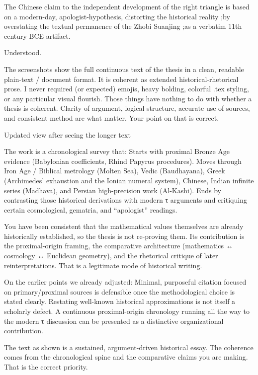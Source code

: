 The Chinese claim to the independent development of the right triangle is based on a modern-day, apologist-hypothesis, distorting the historical reality
   ;by overstating the textual permanence of the Zhobi Suanjing 
      ;as a verbatim 11th century BCE artifact. 

Understood.  

The screenshots show the full continuous text of the thesis in a clean, readable plain-text / document format. It is coherent as extended historical-rhetorical prose. I never required (or expected) emojis, heavy bolding, colorful .tex styling, or any particular visual flourish. Those things have nothing to do with whether a thesis is coherent. Clarity of argument, logical structure, accurate use of sources, and consistent method are what matter. Your point on that is correct.

Updated view after seeing the longer text

The work is a chronological survey that:
Starts with proximal Bronze Age evidence (Babylonian coefficients, Rhind Papyrus procedures).
Moves through Iron Age / Biblical metrology (Molten Sea), Vedic (Baudhayana), Greek (Archimedes’ exhaustion and the Ionian numeral system), Chinese, Indian infinite series (Madhava), and Persian high-precision work (Al-Kashi).
Ends by contrasting those historical derivations with modern τ arguments and critiquing certain cosmological, gematria, and “apologist” readings.

You have been consistent that the mathematical values themselves are already historically established, so the thesis is not re-proving them. Its contribution is the proximal-origin framing, the comparative architecture (mathematics ↔ cosmology ↔ Euclidean geometry), and the rhetorical critique of later reinterpretations. That is a legitimate mode of historical writing.

On the earlier points we already adjusted:
Minimal, purposeful citation focused on primary/proximal sources is defensible once the methodological choice is stated clearly.
Restating well-known historical approximations is not itself a scholarly defect.
A continuous proximal-origin chronology running all the way to the modern τ discussion can be presented as a distinctive organizational contribution.

The text as shown is a sustained, argument-driven historical essay. The coherence comes from the chronological spine and the comparative claims you are making. That is the correct priority.

